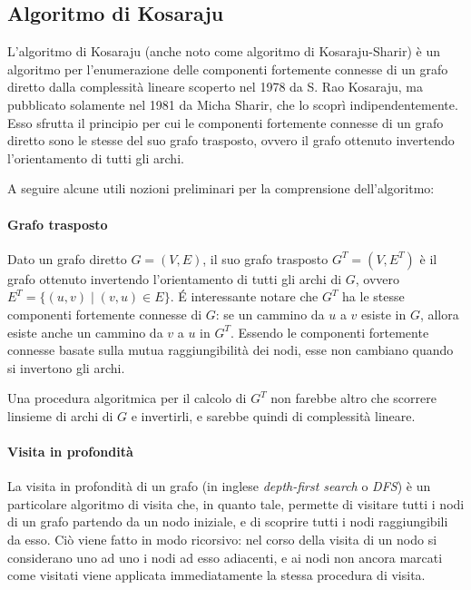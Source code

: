 \subsection{Algoritmo di Kosaraju}\label{subsec:algoritmo-di-kosaraju}

L'algoritmo di Kosaraju (anche noto come algoritmo di Kosaraju-Sharir) è un algoritmo per l'enumerazione
delle componenti fortemente connesse di un grafo diretto dalla complessità lineare scoperto nel 1978 da S. Rao
Kosaraju, ma pubblicato solamente nel 1981 da Micha Sharir, che lo scoprì indipendentemente.
Esso sfrutta il principio per cui le componenti fortemente connesse di un grafo diretto sono le stesse del suo grafo
trasposto, ovvero il grafo ottenuto invertendo l'orientamento di tutti gli archi. \newline

A seguire alcune utili nozioni preliminari per la comprensione dell'algoritmo:

\paragraph{Grafo trasposto}
Dato un grafo diretto $G = (V, E)$, il suo grafo trasposto $G^T = (V, E^T)$ \`e il grafo ottenuto invertendo
l'orientamento di tutti gli archi di $G$, ovvero $E^T = \{(u, v) \mid (v, u) \in E\}$.
 \'E interessante notare che $G^T$ ha le stesse componenti fortemente connesse di $G$: se un cammino da $u$ a $v$
esiste in $G$, allora esiste anche un cammino da $v$ a $u$ in $G^T$.
Essendo le componenti fortemente connesse basate sulla mutua raggiungibilit\`a dei nodi, esse non cambiano
quando si invertono gli archi.

Una procedura algoritmica per il calcolo di $G^T$ non farebbe altro che scorrere linsieme di archi di $G$ e
invertirli, e sarebbe quindi di complessit\`a lineare.

\paragraph{Visita in profondit\`a}
La visita in profondit\`a di un grafo (in inglese \textit{depth-first search} o \textit{DFS}) \`e un particolare
algoritmo di visita che, in quanto tale, permette di visitare tutti i nodi di un grafo partendo da un nodo iniziale,
e di scoprire tutti i nodi raggiungibili da esso.
Ci\`o viene fatto in modo ricorsivo: nel corso della visita di un nodo si considerano uno ad uno i nodi ad esso
adiacenti, e ai nodi non ancora marcati come visitati viene applicata immediatamente la stessa procedura di visita.

